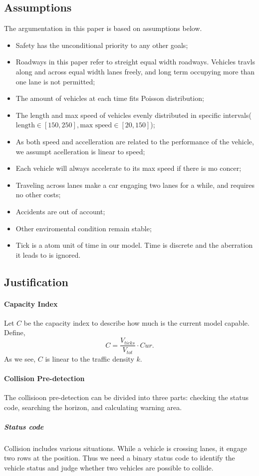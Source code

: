 \subsection{Assumptions}
The argumentation in this paper is based on assumptions below. 
\begin{itemize}
\item Safety has the unconditional priority to any other goals; 
\item Roadways in this paper refer to streight equal width roadways. Vehicles travls along and across equal width lanes freely, and long term occupying more than one lane is not permitted; 
\item The amount of vehicles at each time fits Poisson distribution\cite{breiman1963}; 
\item The length and max speed of vehicles evenly distributed in specific intervals($\text{length}\in\left[150, 250\right], \text{max speed}\in\left[20, 150\right]$); 
\item As both speed and accelleration are related to the performance of the vehicle, we assumpt acelleration is linear to speed; 
\item Each vehicle will always accelerate to its max speed if there is mo concer; 
\item Traveling across lanes make a car engaging two lanes for a while, and requires no other costs; 
\item Accidents are out of account; 
\item Other enviromental condition remain stable; 
\item Tick is a atom unit of time in our model. Time is discrete and the aberration it leads to is ignored.
\end{itemize}
\subsection{Justification}
\paragraph{Capacity Index}
Let $C$ be the capacity index to describe how much is the current model capable. Define, 
\[
C=\frac{V_{ticks}}{V_{tot}}\cdot Cur. 
\]
As we see, $C$ is linear to the traffic density $k$. 
\paragraph{Collision Pre-detection}
The collisioon pre-detection can be divided into three parts: 
checking the status code, searching the horizon, and calculating warning area. 
\subparagraph{Status code}
Collision includes various situations. 
While a vehicle is crossing lanes, it engage two rows at the position. 
Thus we need a binary status code to identify the vehicle status and judge whether two vehicles are possible to collide. 

